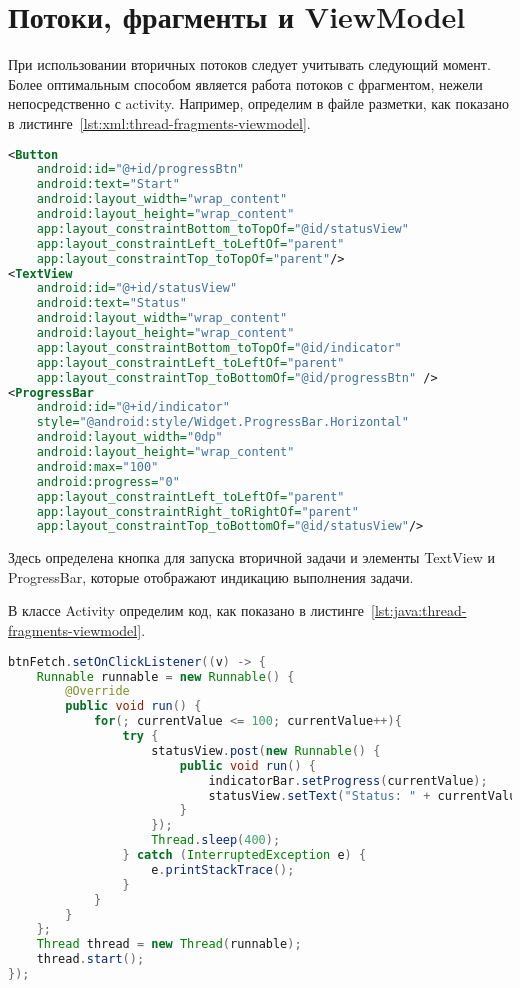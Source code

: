 \section{Потоки, фрагменты и ViewModel}
При использовании вторичных потоков следует учитывать следующий момент.
Более оптимальным способом является работа потоков с фрагментом,
нежели непосредственно с activity. Например, определим в файле
разметки, как показано в листинге~\ref{lst:xml:thread-fragments-viewmodel}.

\begin{lstlisting}[language=XML
	, label=lst:xml:thread-fragments-viewmodel
	]
<Button
	android:id="@+id/progressBtn"
	android:text="Start"
	android:layout_width="wrap_content"
	android:layout_height="wrap_content"
	app:layout_constraintBottom_toTopOf="@id/statusView"
	app:layout_constraintLeft_toLeftOf="parent"
	app:layout_constraintTop_toTopOf="parent"/>
<TextView
	android:id="@+id/statusView"
	android:text="Status"
	android:layout_width="wrap_content"
	android:layout_height="wrap_content"
	app:layout_constraintBottom_toTopOf="@id/indicator"
	app:layout_constraintLeft_toLeftOf="parent"
	app:layout_constraintTop_toBottomOf="@id/progressBtn" />
<ProgressBar
	android:id="@+id/indicator"
	style="@android:style/Widget.ProgressBar.Horizontal"
	android:layout_width="0dp"
	android:layout_height="wrap_content"
	android:max="100"
	android:progress="0"
	app:layout_constraintLeft_toLeftOf="parent"
	app:layout_constraintRight_toRightOf="parent"
	app:layout_constraintTop_toBottomOf="@id/statusView"/>
\end{lstlisting}

Здесь определена кнопка для запуска вторичной задачи и элементы TextView
и ProgressBar, которые отображают индикацию выполнения задачи.\par
В классе Activity определим код, как показано
в листинге~\ref{lst:java:thread-fragments-viewmodel}.

\begin{lstlisting}[language=Java
	, label=lst:java:thread-fragments-viewmodel
	]
btnFetch.setOnClickListener((v) -> {
	Runnable runnable = new Runnable() {
		@Override
		public void run() {
			for(; currentValue <= 100; currentValue++){
				try {
					statusView.post(new Runnable() {
						public void run() {
							indicatorBar.setProgress(currentValue);
							statusView.setText("Status: " + currentValue);
						}
					});
					Thread.sleep(400);
				} catch (InterruptedException e) {
					e.printStackTrace();
				}
			}
		}
	};
	Thread thread = new Thread(runnable);
	thread.start();
});
\end{lstlisting}

